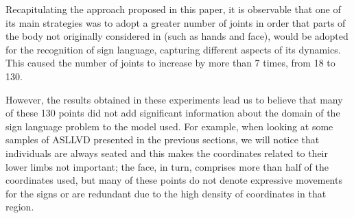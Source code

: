 
Recapitulating the approach proposed in this paper, it is observable that one of its main strategies was to adopt a greater number of joints in order that parts of the body not originally considered in \cite{st-gcn-2018} (such as hands and face), would be adopted for the recognition of sign language, capturing different aspects of its dynamics. This caused the number of joints to increase by more than 7 times, from 18 to 130.


However, the results obtained in these experiments lead us to believe that many of these 130 points did not add significant information about the domain of the sign language problem to the model used. For example, when looking at some samples of ASLLVD presented in the previous sections, we will notice that individuals are always seated and this makes the coordinates related to their lower limbs not important; the face, in turn, comprises more than half of the coordinates used, but many of these points do not denote expressive movements for the signs or are redundant due to the high density of coordinates in that region.


